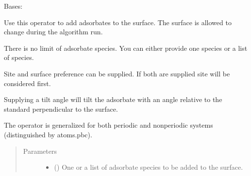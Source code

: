 \documentclass[letterpaper,10pt,english]{sphinxmanual}
\begin{document}
\begin{fulllineitems}
\label{\detokenize{ga:acat.ga.adsorbate_operators.AddAdsorbate}}
Bases: {\hyperref[\detokenize{ga:acat.ga.adsorbate_operators.AdsorbateOperator}]{}}

Use this operator to add adsorbates to the surface.
The surface is allowed to change during the algorithm run.

There is no limit of adsorbate species. You can either provide one
species or a list of species.

Site and surface preference can be supplied. If both are supplied site
will be considered first.

Supplying a tilt angle will tilt the adsorbate with an angle relative
to the standard perpendicular to the surface.

The operator is generalized for both periodic and non\sphinxhyphen{}periodic systems
(distinguished by atoms.pbc).
\begin{quote}\begin{description}
\item[{Parameters}] \leavevmode\begin{itemize}
\item {} 
 () \textendash{} One or a list of adsorbate species to be added to the surface.


\end{itemize}
\end{description}
\end{quote}
\end{fulllineitems}
\end{document}
